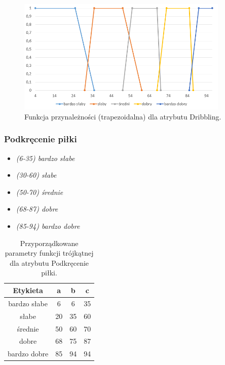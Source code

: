 \documentclass{classrep}
\begin{document}
	\begin{figure}[h!]
		\centering
		\includegraphics[width=0.9\textwidth]{zmienne/6.png}
		\caption{Funkcja przynależności (trapezoidalna) dla atrybutu Dribbling.}
		\label{wykresDribbling}
	\end{figure}
	
	
	\newpage
	\subsubsection{Podkręcenie piłki}
	\begin{itemize}
		\item \textsl{(6-35) bardzo słabe}
		\item \textsl{(30-60) słabe}
		\item \textsl{(50-70) średnie}
		\item \textsl{(68-87) dobre}
		\item \textsl{(85-94) bardzo dobre}
	\end{itemize}
	
	\begin{table}[h!]
		\centering
		\begin{tabular} {c c c c}
			\hline
			\textbf{Etykieta} & \textbf{a} & \textbf{b} & \textbf{c} \\ [0.5ex] 
			\hline	
			\hline 
			bardzo słabe & 6 & 6 & 35 \\
			słabe & 20 & 35 & 60   \\
			średnie & 50 & 60 & 70  \\
			dobre & 68 & 75 & 87   \\
			bardzo dobre & 85 & 94 & 94  \\					
			\hline
		\end{tabular}
		\caption{Przyporządkowane parametry funkcji trójkątnej dla atrybutu Podkręcenie piłki. }
		\label{tabelaPodkrecenie}
	\end{table}
	
\end{document}
